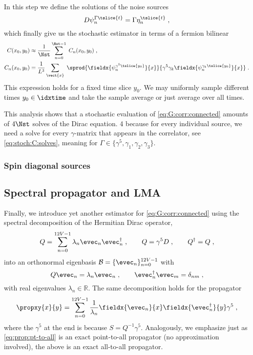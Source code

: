 In this step we define the solutions of the noise sources
\begin{equation} \label{eq:stoch:C:solves}
D \psi_{n}^{\Gamma \tslice{t}} = \Gamma \eta_n^{\tslice{t}} \;,
\end{equation}
which finally give us the stochastic estimator in terms of a fermion bilinear
\begin{align} \label{eq:stoch:C:full:final}
C(x_0, y_0)
&\approx \frac{1}{\Nst} \sum_{n=0}^{\Nst-1} \; C_n(x_0, y_0) \;, \\
C_n(x_0, y_0)
&= \frac{1}{L^{3}} \sum_{\vect{x}} \;
\sprod{
  \fieldx{\psi_{n}^{\gamma^{5} \tslice{y_0}}}{x}
}{
  \gamma^{5}
  \gamma_k
  \fieldx{\psi_{n}^{\gamma_k \tslice{y_0}}}{x}
} \;.
\end{align}
This expression holds for a fixed time slice $y_0$.
We may uniformly sample different times $y_0 \in \idxtime$ and take the sample average or just average over all times.

This analysis shows that a stochastic evaluation of \cref{eq:G:corr:connected} amounts of $4 \Nst$ solves of the Dirac equation. \num{4} because for every individual source, we need a solve for every $\gamma$-matrix that appears in the correlator, see \cref{eq:stoch:C:solves}, meaning for $\Gamma \in \{ \gamma^{5}, \gamma_1, \gamma_2, \gamma_3 \}$.

\subsubsection{Spin diagonal sources}


\subsection{Spectral propagator and LMA}

Finally, we introduce yet another estimator for \cref{eq:G:corr:connected} using the spectral decomposition of the Hermitian Dirac operator,
\begin{equation}
Q = \sum_{n=0}^{12V-1} \lambda_{n} \evec_{n} \evec_{n}^{\dagger} \;,
\qquad
Q = \gamma^{5} D \;,
\qquad
Q^{\dagger} = Q \;,
\end{equation}
into an orthonormal eigenbasis $\mathcal{B} = \{ \evec_n \}_{n=0}^{12V-1}$ with
\begin{equation}
Q \evec_{n} = \lambda_{n} \evec_{n} \;,
\qquad
\evec_{n}^{\dagger} \evec_{m} = \delta_{nm} \;,
\end{equation}
with real eigenvalues $\lambda_{n} \in \mathbb{R}$.
The same decomposition holds for the propagator
\begin{equation} \label{eq:prop:all-to-all}
\propxy{x}{y} = \sum_{n=0}^{12V-1} \frac{1}{\lambda_{n}} \fieldx{\evec_{n}}{x} \fieldx{\evec_{n}^{\dagger}}{y} \gamma^{5} \;,
\end{equation}
where the $\gamma^{5}$ at the end is because $S = Q^{-1} \gamma^{5}$.
Analogously, we emphasize just as \cref{eq:prop:pt-to-all} is an exact point-to-all propagator (no approximation involved), the above is an exact all-to-all propagator.

